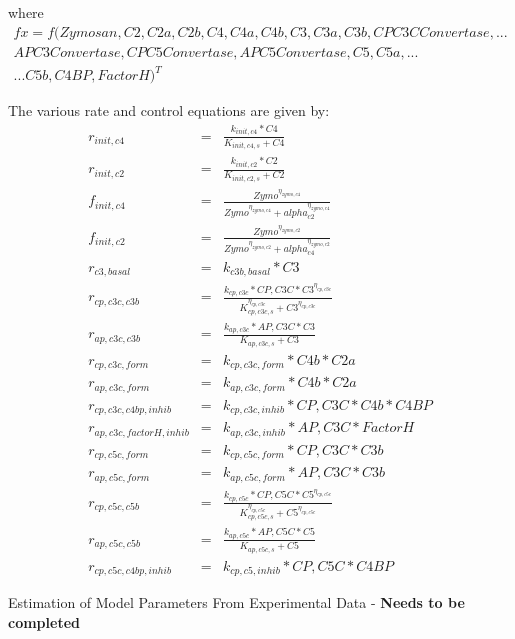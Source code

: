\documentclass[12pt]{article}
\makeatletter
\renewcommand\subsection{\@startsection
	{subsection}{2}{0mm}
	{-0.05in}
	{-0.5\baselineskip}
	{\normalfont\normalsize\bfseries}}
\makeatother
\begin{document}
where \begin{multline}
f{x} = f(Zymosan,C2,C2a,C2b,C4,C4a,C4b,C3,C3a,C3b,CP C3C Convertase,... \\
           AP C3 Convertase,CP C5 Convertase,AP C5 Convertase,C5,C5a,... \\
           ... C5b,C4BP,Factor H)^{T}
\end{multline}

The various rate and control equations are given by:
\begin{eqnarray}
	r_{init,c4} &=& \frac{k_{init,c4}*C4}{K_{init,c4,s} + C4} \\
	r_{init,c2} &=& \frac{k_{init,c2}*C2}{K_{init,c2,s} + C2} \\
	f_{init,c4} &=& \frac{Zymo^{\eta_{zymo,c4}}}{Zymo^{\eta_{zymo,c4}} + alpha_{c2}^{\eta_{zymo,c4}}} \\
	f_{init,c2} &=& \frac{Zymo^{\eta_{zymo,c2}}}{Zymo^{\eta_{zymo,c2}} + alpha_{c4}^{\eta_{zymo,c2}}} \\
	r_{c3,basal} &=& k_{c3b,basal}*C3 \\
	r_{cp,c3c,c3b} &=& \frac{k_{cp,c3c}*CP,C3C*C3^{\eta_{cp,c3c}}}{K_{cp,c3c,s}^{\eta_{cp,c3c}} + C3^{\eta_{cp,c3c}}}  \\
	r_{ap,c3c,c3b} &=& \frac{k_{ap,c3c}*AP,C3C*C3}{K_{ap,c3c,s} + C3} \\
	r_{cp,c3c,form} &=& k_{cp,c3c,form}*C4b*C2a \\
	r_{ap,c3c,form} &=& k_{ap,c3c,form}*C4b*C2a \\
	r_{cp,c3c,c4bp,inhib} &=& k_{cp,c3c,inhib}*CP,C3C*C4b*C4BP \\
	r_{ap,c3c,factorH,inhib} &=& k_{ap,c3c,inhib}*AP,C3C*FactorH \\ 
	r_{cp,c5c,form} &=& k_{cp,c5c,form}*CP,C3C*C3b \\
	r_{ap,c5c,form} &=& k_{ap,c5c,form}*AP,C3C*C3b \\
	 r_{cp,c5c,c5b} &=& \frac{k_{cp,c5c}*CP,C5C*C5^{\eta_{cp,c5c}}}{K_{cp,c5c,s}^{\eta_{cp,c5c}} + C5^{\eta_{cp,c5c}}} \\
	 r_{ap,c5c,c5b} &=& \frac{k_{ap,c5c}*AP,C5C*C5}{K_{ap,c5c,s} + C5} \\
	 r_{cp,c5c,c4bp,inhib} &=& k_{cp,c5,inhib}*CP,C5C*C4BP
\end{eqnarray}

\subsection{Estimation of Model Parameters From Experimental Data - \textbf{Needs to be completed}}
\end{document}
